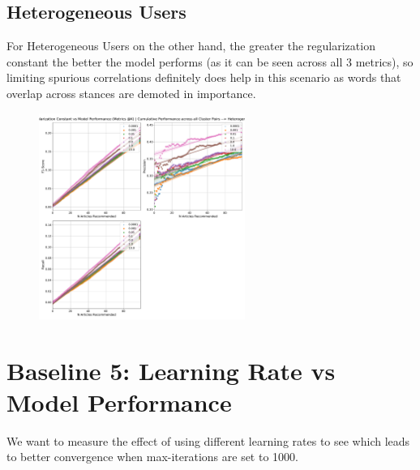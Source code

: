 \documentclass[a4paper,fontsize=9.0pt]{scrartcl}
\begin{document}
\subsection{Heterogeneous Users}
\begin{flushleft}
For Heterogeneous Users on the other hand, the greater the regularization constant the better the model performs (as it can be seen across all 3 metrics), so limiting spurious correlations definitely does help in this scenario as words that overlap across stances are demoted in importance. 
\end{flushleft}
\begin{figure}[H]
 \includegraphics[width=0.6\textwidth]{Graphs/regularization_vs_model_performance_cumu_Heterogeneous.pdf}
\end{figure}



\vspace{-3ex}
\section{Baseline 5: Learning Rate vs Model Performance}
\begin{flushleft}
We want to measure the effect of using different learning rates to see which leads to better convergence when max-iterations are set to 1000.
\end{flushleft}
\vspace{-3ex}
\end{document}
